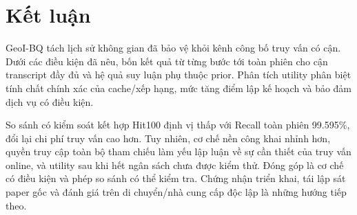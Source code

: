 \section{Kết luận}\label{sec:conclusion}
GeoI-BQ tách lịch sử không gian đã bảo vệ khỏi kênh công bố truy vấn có cận.
Dưới các điều kiện đã nêu, bốn kết quả từ từng bước tới toàn phiên cho cận
transcript đầy đủ và hệ quả suy luận phụ thuộc prior. Phân tích utility phân
biệt tính chất chính xác của cache/xếp hạng, mức tăng điểm lập kế hoạch và
bảo đảm dịch vụ có điều kiện.

So sánh có kiểm soát kết hợp Hit100 định vị thấp với Recall toàn phiên
99.595\%, đổi lại chi phí truy vấn cao hơn. Tuy nhiên, cơ chế nền công khai
nhỉnh hơn, quyền truy cập toàn bộ tham chiếu làm yếu lập luận về sự cần thiết
của truy vấn online, và utility sau khi hết ngân sách chưa được kiểm thử.
Đóng góp là cơ chế có điều kiện và phép so sánh có thể kiểm tra. Chứng nhận
triển khai, tái lập sát paper gốc và đánh giá trên di chuyển/nhà cung cấp độc
lập là những hướng tiếp theo.
